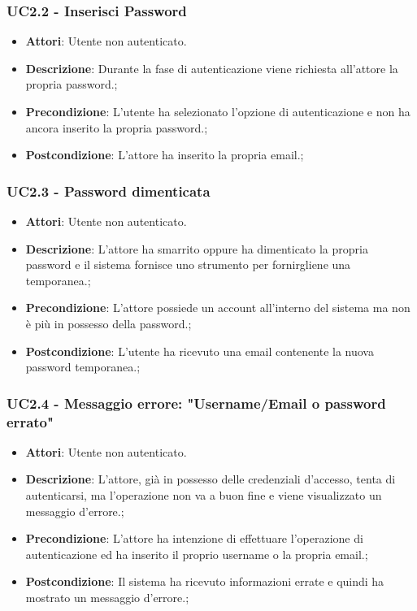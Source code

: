 \subsubsection{UC2.2 - Inserisci Password} 
\label{sssec:UC2.2} 
\begin{itemize} 
\item \textbf{Attori}: Utente non autenticato.
\item \textbf{Descrizione}: Durante la fase di autenticazione viene richiesta all'attore la propria password.;
\item \textbf{Precondizione}: L'utente ha selezionato l'opzione di autenticazione e non ha ancora inserito la propria password.;
\item \textbf{Postcondizione}: L'attore ha inserito la propria email.;
\end{itemize} 
\subsubsection{UC2.3 - Password dimenticata} 
\label{sssec:UC2.3} 
\begin{itemize} 
\item \textbf{Attori}: Utente non autenticato.
\item \textbf{Descrizione}: L'attore ha smarrito oppure ha dimenticato la propria password e il sistema fornisce uno strumento per fornirgliene una temporanea.;
\item \textbf{Precondizione}: L'attore possiede un account all'interno del sistema ma non è più in possesso della password.;
\item \textbf{Postcondizione}: L'utente ha ricevuto una email contenente la nuova password temporanea.;
\end{itemize} 
\subsubsection{UC2.4 - Messaggio errore: "Username/Email o password errato"} 
\label{sssec:UC2.4} 
\begin{itemize} 
\item \textbf{Attori}: Utente non autenticato.
\item \textbf{Descrizione}: L'attore, già in possesso delle credenziali d'accesso, tenta di autenticarsi, ma l'operazione non va a buon fine e viene visualizzato un messaggio d'errore.;
\item \textbf{Precondizione}: L'attore ha intenzione di effettuare l'operazione di autenticazione ed ha inserito il proprio username o la propria email.;
\item \textbf{Postcondizione}: Il sistema ha ricevuto informazioni errate e quindi ha mostrato un messaggio d'errore.;
\end{itemize} 
